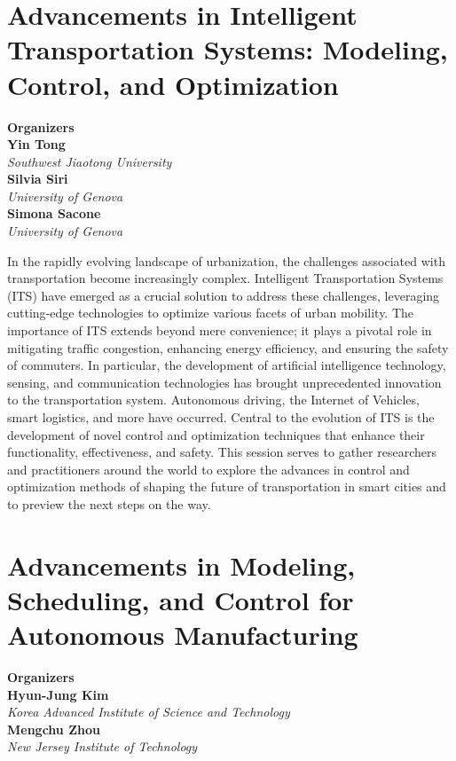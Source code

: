 \section{Advancements in Intelligent Transportation Systems: Modeling, Control, and Optimization}


\large \textbf{Organizers} \normalsize \vspace{2mm} \\
\textbf{Yin  Tong} \\ 
\textit{Southwest Jiaotong University} \vspace{{2mm}} \\
\textbf{Silvia  Siri} \\ 
\textit{University of Genova} \vspace{{2mm}} \\
\textbf{Simona  Sacone} \\ 
\textit{University of Genova}

In the rapidly evolving landscape of urbanization, the challenges associated with transportation become increasingly complex. Intelligent Transportation Systems (ITS) have emerged as a crucial solution to address these challenges, leveraging cutting-edge technologies to optimize various facets of urban mobility. The importance of ITS extends beyond mere convenience; it plays a pivotal role in mitigating traffic congestion, enhancing energy efficiency, and ensuring the safety of commuters. In particular, the development of artificial intelligence technology, sensing, and communication technologies has brought unprecedented innovation to the transportation system. Autonomous driving, the Internet of Vehicles, smart logistics, and more have occurred. Central to the evolution of ITS is the development of novel control and optimization techniques that enhance their functionality, effectiveness, and safety. This session serves to gather researchers and practitioners around the world to explore the advances in control and optimization methods of shaping the future of transportation in smart cities and to preview the next steps on the way. 

\section{Advancements in Modeling, Scheduling, and Control for Autonomous Manufacturing}


\large \textbf{Organizers} \normalsize \vspace{2mm} \\
\textbf{Hyun-Jung  Kim} \\ 
\textit{Korea Advanced Institute of Science and Technology} \vspace{{2mm}} \\
\textbf{Mengchu  Zhou} \\ 
\textit{New Jersey Institute of Technology}

